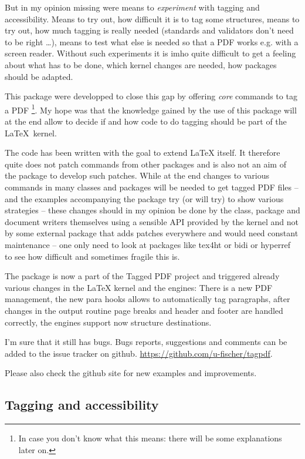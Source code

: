 \documentclass[DIV=12,parskip=half-,bibliography=totoc]{scrartcl}
\newcommand\PDF{PDF}
\begin{document}
But in my opinion missing were means to \emph{experiment} with tagging and accessibility. Means to try out, how difficult it is to tag some structures, means to try out, how much tagging is really needed (standards and validators don't need to be right \ldots), means to test what else is needed so that a \PDF{} works e.g. with a screen reader. Without such experiments it is imho quite difficult to get a feeling about what has to be done, which kernel changes are needed, how packages should be adapted.


This package were developped to close this gap by offering \emph{core} commands to tag a \PDF{}%
\footnote{In case you don't know what this means: there will be some explanations later on.}.
My hope was that the knowledge gained by the use of this package will at the end allow to decide if and how code to do tagging should be part of the \LaTeX\ kernel.


The code has been written with the goal to extend \LaTeX{} itself.
It therefore quite does not patch commands from other packages and is also not an aim of the package to develop such patches. While at the end changes to various commands in many classes and packages will be needed to get tagged \PDF{} files -- and the examples accompanying the package try (or will try) to show various strategies -- these changes should in my opinion be done by the class, package and document writers themselves using a sensible API provided by the kernel and not by some external package that adds patches everywhere and would need constant maintenance -- one only need to look at packages like tex4ht or bidi or hyperref to see how difficult and sometimes fragile this is.


The package is now a part of the Tagged PDF project and triggered already various changes in the LaTeX kernel and the engines: There is a new PDF management,
the new para hooks allows to automatically tag paragraphs, after changes in the output routine
page breaks and header and footer are handled correctly, the engines support
now structure destinations.

I'm sure that it still has bugs. Bugs reports, suggestions and comments can be added to the issue tracker on github. \url{https://github.com/u-fischer/tagpdf}.

Please also check the github site for new examples and improvements.

\subsection{Tagging and accessibility}
\end{document}
